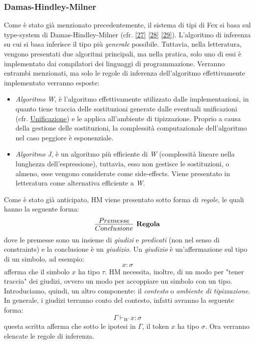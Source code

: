 \documentclass[10pt,a4paper]{article}
\begin{document}
\hypertarget{Damas-Hindley-Milner}{\subsubsection{Damas-Hindley-Milner}}
Come è stato già menzionato precedentemente, il sistema di tipi di Fex si basa sul type-system di Damas-Hindley-Milner
(cfr. \hyperlink{bibl27}{[27]} \hyperlink{bibl28}{[28]} \hyperlink{bibl29}{[29]}).
L'algoritmo di inferenza su cui si basa inferisce il tipo più \textit{generale} possibile. Tuttavia, nella letteratura,
vengono presentati due algoritmi principali, ma nella pratica, solo uno di essi è implementato dai compilatori dei
linguaggi di programmazione. Verranno entrambi menzionati, ma solo le regole di inferenza dell'algoritmo effettivamente
implementato verranno esposte:
\begin{itemize}
    \item \textit{Algoritmo W}, è l'algoritmo effettivamente utilizzato dalle implementazioni, in quanto tiene traccia
    delle sostituzioni generate dalle eventuali unificazioni (cfr. \hyperlink{Unificazione}{Unificazione}) e le applica
    all'ambiente di
    tipizzazione. Proprio a causa della gestione delle sostituzioni, la complessità computazionale dell'algoritmo
    nel caso peggiore è esponenziale.
    \item \textit{Algoritmo J}, è un algoritmo più efficiente di \textit{W} (complessità lineare nella lunghezza
    dell'espressione),
    tuttavia, esso non gestisce le sostituzioni, o almeno, esse vengono considerate come side-effects. Viene
    presentato in letteratura come alternativa efficiente a \textit{W}.
\end{itemize}

Come è stato già anticipato, HM viene presentato sotto forma di \textit{regole}, le quali hanno la seguente forma:
\newline
\[ \infer[\textbf{Regola}]{Conclusione}{Premesse} \]
dove le premesse sono un insieme di \textit{giudizi} e \textit{predicati} (non nel senso di constraints) e la conclusione
è un \textit{giudizio}. Un \textit{giudizio} è un'affermazione sul tipo di un simbolo, ad esempio:
\[ x : \sigma \]
afferma che il simbolo $ x $ ha tipo $ \tau $. HM necessita, inoltre, di un modo per "tener traccia" dei giudizi,
ovvero un modo per accoppiare un simbolo con un tipo. Introduciamo, quindi,
un altro componente: il \textit{contesto} o \textit{ambiente di tipizzazione}. In generale, i giudizi terranno conto
del contesto, infatti avranno la seguente forma:
\[ \Gamma \vdash_W x : \sigma \]
questa scritta afferma che sotto le ipotesi in $ \Gamma $, il token $ x $ ha tipo $ \sigma $.
Ora verranno elencate le regole di inferenza.
\end{document}
